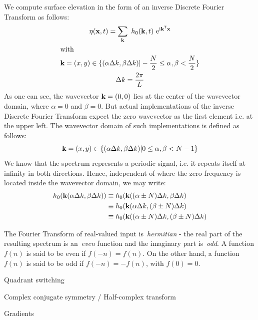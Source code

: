 %
We compute surface elevation in the form of an inverse Discrete Fourier Transform as follows:
\begin{gather*}
\label{eq:dft_surface_elevation}
\eta(\mathbf{x}, t) = \sum_{\mathbf{k}}~h_0(\mathbf{k},t)~\mathrm{e}^{\mathrm{i}\mathbf{k}^{\mathsf{T}}\mathbf{x}} \\
\intertext{with}
\mathbf{k} = (x,y)\in\{(\alpha\Delta k,\beta\Delta k)|
-\frac{N}{2}\leq\alpha,\beta<\frac{N}{2}\} \\
\Delta k = \frac{2\pi}{L}
\end{gather*}
As one can see, the wavevector $\mathbf{k} = (0,0)$ lies at the center of the wavevector domain,
where $\alpha=0$ and $\beta=0$. But actual implementations of the inverse Discrete Fourier Transform
expect the zero wavevector as the first element i.e. at the upper left. The wavevector domain
of such implementations is defined as follows:
\begin{equation*}
\mathbf{k} = (x,y)\in\{(\alpha\Delta k,\beta\Delta k)|
0\leq\alpha,\beta<N-1\}
\end{equation*}
We know that the spectrum represents a periodic signal, i.e. it repeats itself at infinity in both directions.
Hence, independent of where the zero frequency is located inside the wavevector domain, we may write:
\begin{align*}
 h_0(\mathbf{k}(\alpha\Delta k,\beta\Delta k)) &\equiv h_0(\mathbf{k}((\alpha\pm N)\Delta k, \beta\Delta k) \\
					     &\equiv h_0(\mathbf{k}(\alpha\Delta k, (\beta\pm N)\Delta k) \\
					     &\equiv h_0(\mathbf{k}((\alpha\pm N)\Delta k, (\beta\pm N)\Delta k)
\end{align*}

The Fourier Transform of real-valued input is~\emph{hermitian} - the real part of the resulting spectrum
is an~\emph{even} function and the imaginary part is~\emph{odd}. A function $f(n)$ is said to be even if
$f(-n) = f(n)$. On the other hand, a function $f(n)$ is said to be odd if $f(-n) = -f(n)$,
with $f(0) = 0$.


Quadrant switching

Complex conjugate symmetry / Half-complex transform

Gradients



